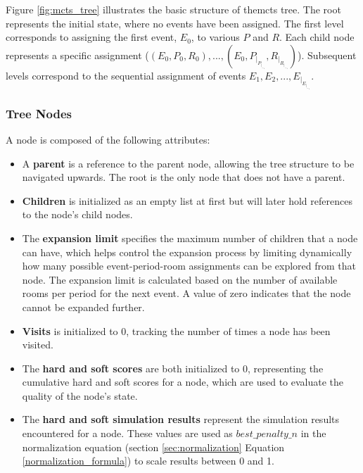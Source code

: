 Figure \ref{fig:mcts_tree} illustrates the basic structure of the\ac{mcts} tree. The root represents the initial state, where no events have been assigned. The first level corresponds to assigning the first event, \(E_0\), to various \(P\) and \(R\). Each child node represents a specific assignment (\((E_0,P_0,R_0),...,(E_0,P_|_P_|_-_1,R_|_R_|_-_1)\)). Subsequent levels correspond to the sequential assignment of events \(E_1, E_2, ..., E_|_E_|_-_1\).

\subsubsection{Tree Nodes}

A node is composed of the following attributes:

\begin{itemize}

\item A \textbf{parent} is a reference to the parent node, allowing the tree structure to be navigated upwards. The root is the only node that does not have a parent.

\item \textbf{Children} is initialized as an empty list at first but will later hold references to the node's child nodes. 

\item The \textbf{expansion limit} specifies the maximum number of children that a node can have, which helps control the expansion process by limiting dynamically how many possible event-period-room assignments can be explored from that node. The expansion limit is calculated based on the number of available rooms per period for the next event. A value of zero indicates that the node cannot be expanded further.

\item \textbf{Visits} is initialized to 0, tracking the number of times a node has been visited.

\item The \textbf{hard and soft scores} are both initialized to 0, representing the cumulative hard and soft scores for a node, which are used to evaluate the quality of the node's state.

\item The \textbf{hard and soft simulation results} represent the simulation results encountered for a node. These values are used as \(best\_penalty\_n\) in the normalization equation (section \ref{sec:normalization} Equation \ref{normalization_formula}) to scale results between 0 and 1.
\end{itemize}

